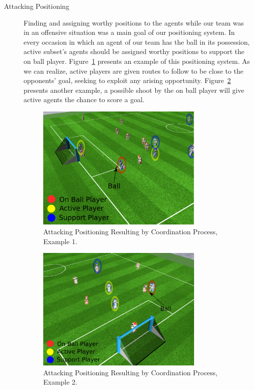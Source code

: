 \begin{description}
\item[Attacking Positioning]
Finding and assigning worthy positions to the agents while our team was in an offensive situation was a main goal of our positioning system. In every occasion in which an agent of our team has the ball in its possession, active subset's agents should be assigned worthy positions to support the on ball player. Figure~\ref{fig:AttackingPositioning1} presents an example of this positioning system. As we can realize, active players are given routes to follow to be close to the opponents' goal, seeking to exploit any arising opportunity. Figure~\ref{fig:AttackingPositioning2} presents another example, a possible shoot by the on ball player will give active agents the chance to score a goal.


\begin{figure}[h!]
\centering
  \includegraphics[width=0.8\textwidth]{Chapter5/figures/3.pdf}
  \caption{Attacking Positioning Resulting by Coordination Process, Example 1.} 
  \label{fig:AttackingPositioning1}
\end{figure}

\begin{figure}[h!]
\centering
  \includegraphics[width=0.8\textwidth]{Chapter5/figures/5.pdf}
  \caption{Attacking Positioning Resulting by Coordination Process, Example 2.} 
  \label{fig:AttackingPositioning2}
\end{figure}



\end{description}
